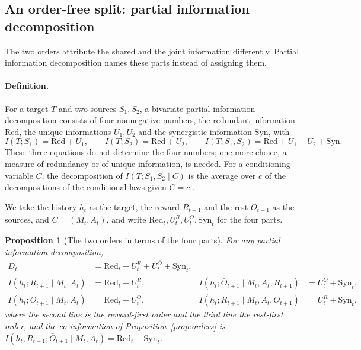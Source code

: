 \documentclass{article}
\newtheorem{proposition}{Proposition}
\theoremstyle{definition}
\theoremstyle{remark}
\newcommand{\Ob}{\bar O}
\begin{document}
\subsection{An order-free split: partial information decomposition}\label{sec:pid}

The two orders attribute the shared and the joint information differently. Partial information decomposition \citep{williams2010nonnegative} names these parts instead of assigning them.

\paragraph{Definition.} For a target $T$ and two sources $S_1,S_2$, a bivariate partial information decomposition consists of four nonnegative numbers, the redundant information $\mathrm{Red}$, the unique informations $U_1,U_2$ and the synergistic information $\mathrm{Syn}$, with
\[
I(T;S_1)=\mathrm{Red}+U_1,\qquad I(T;S_2)=\mathrm{Red}+U_2,\qquad I(T;S_1,S_2)=\mathrm{Red}+U_1+U_2+\mathrm{Syn}.
\]
These three equations do not determine the four numbers; one more choice, a measure of redundancy or of unique information, is needed. For a conditioning variable $C$, the decomposition of $I(T;S_1,S_2\mid C)$ is the average over $c$ of the decompositions of the conditional laws given $C=c$ \citep[Definition~3]{matthias2025novel}.

We take the history $h_t$ as the target, the reward $R_{t+1}$ and the rest $\Ob_{t+1}$ as the sources, and $C=(M_t,A_t)$, and write $\mathrm{Red}_t,U^R_t,U^{\Ob}_t,\mathrm{Syn}_t$ for the four parts.

\begin{proposition}[The two orders in terms of the four parts]\label{prop:pid}
For any partial information decomposition,
\begin{align*}
D_t&=\mathrm{Red}_t+U^R_t+U^{\Ob}_t+\mathrm{Syn}_t,\\
I(h_t;R_{t+1}\mid M_t,A_t)&=\mathrm{Red}_t+U^R_t, & I(h_t;\Ob_{t+1}\mid M_t,A_t,R_{t+1})&=U^{\Ob}_t+\mathrm{Syn}_t,\\
I(h_t;\Ob_{t+1}\mid M_t,A_t)&=\mathrm{Red}_t+U^{\Ob}_t, & I(h_t;R_{t+1}\mid M_t,A_t,\Ob_{t+1})&=U^R_t+\mathrm{Syn}_t,
\end{align*}
where the second line is the reward-first order and the third line the rest-first order,
and the co-information of Proposition~\ref{prop:orders} is $I(h_t;R_{t+1};\Ob_{t+1}\mid M_t,A_t)=\mathrm{Red}_t-\mathrm{Syn}_t$.
\end{proposition}
\end{document}
